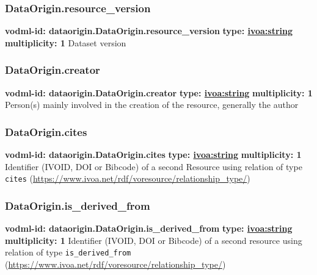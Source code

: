    \subsubsection{DataOrigin.resource\_version}
      \textbf{vodml-id: dataorigin.DataOrigin.resource\_version} \newline
      \textbf{type: \hyperref[sect:ivoa]{ivoa:string}} \newline
      \textbf{multiplicity: 1} \newline 
      Dataset version

    \subsubsection{DataOrigin.creator}
      \textbf{vodml-id: dataorigin.DataOrigin.creator} \newline
      \textbf{type: \hyperref[sect:ivoa]{ivoa:string}} \newline
      \textbf{multiplicity: 1} \newline 
      Person(s) mainly involved in the creation of the resource, generally the author

    \subsubsection{DataOrigin.cites}
      \textbf{vodml-id: dataorigin.DataOrigin.cites} \newline
      \textbf{type: \hyperref[sect:ivoa]{ivoa:string}} \newline
      \textbf{multiplicity: 1} \newline 
      Identifier (IVOID, DOI or Bibcode) of a second Resource using relation of type \texttt{cites} (\url{https://www.ivoa.net/rdf/voresource/relationship\_type/})

    \subsubsection{DataOrigin.is\_derived\_from}
      \textbf{vodml-id: dataorigin.DataOrigin.is\_derived\_from} \newline
      \textbf{type: \hyperref[sect:ivoa]{ivoa:string}} \newline
      \textbf{multiplicity: 1} \newline 
      Identifier (IVOID, DOI or Bibcode) of a second resource using relation of type \texttt{is\_derived\_from} (\url{https://www.ivoa.net/rdf/voresource/relationship\_type/})

